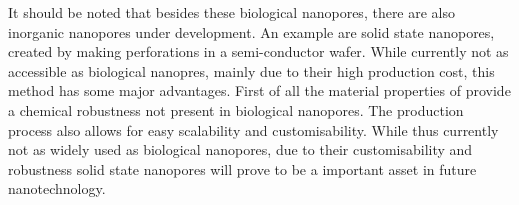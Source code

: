 It should be noted that besides these biological nanopores, there are also inorganic
nanopores under development. An example are solid state nanopores, created by making
perforations in a semi-conductor wafer. While currently not as accessible as biological
nanopres, mainly due to their high production cost, this method has some major
advantages. First of all the material properties of provide a chemical robustness not
present in biological nanopores. The production process also allows for easy scalability
and customisability. While thus currently not as widely used as biological nanopores, due
to their customisability and robustness solid state nanopores will prove to be a
important asset in future nanotechnology.
